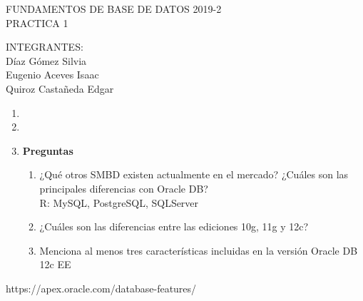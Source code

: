\documentclass[10pt,onecolumn]{article}
\begin{document}

\begin{center}
{FUNDAMENTOS DE BASE DE DATOS 2019-2 \\PRACTICA 1}
\end{center}
\vspace{0.2cm}
\begin{center}
{\small{INTEGRANTES:\\Díaz Gómez Silvia\\ Eugenio Aceves Isaac \\ Quiroz Castañeda Edgar}}
\end{center}

\begin{enumerate}
	\item 
	\item 
	\item \bf{Preguntas}\\
	\begin{enumerate}
		\item ¿Qué otros SMBD existen actualmente en el mercado? ¿Cuáles son las principales diferencias con Oracle DB?\\
		R: MySQL, PostgreSQL, SQLServer
        \item ¿Cuáles son las diferencias entre las ediciones 10g, 11g y 12c?\\
        \item Menciona al menos tres características incluidas en la versión Oracle DB 12c EE\\
	\end{enumerate}
\end{enumerate}

https://apex.oracle.com/database-features/

\vspace{1 cm}

{\bf }

\vspace{0.2cm}











 
\end{document}
